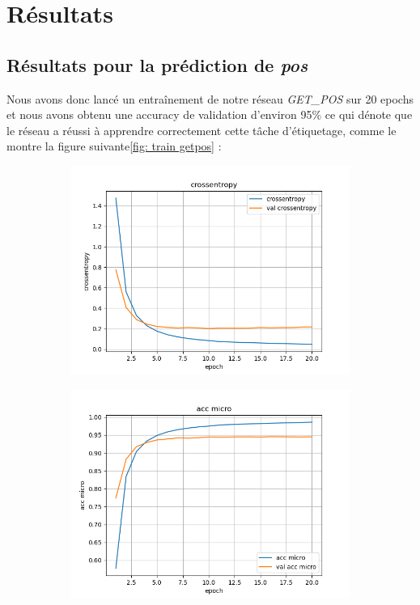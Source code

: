 \documentclass[a4paper]{article}
\begin{document}
\section{Résultats}

\subsection{Résultats pour la prédiction de \textit{pos}}
Nous avons donc lancé un entraînement de notre réseau \textit{GET\_POS} sur 20 epochs et 
nous avons obtenu une accuracy de validation d'environ 95\% ce qui dénote que le réseau a réussi à apprendre 
correctement cette tâche d'étiquetage, comme le montre la figure suivante\ref{fig: train getpos} :

\begin{figure}[H]
    \centering
    \begin{subfigure}{0.32\textwidth}
        \centering
        \includegraphics[width=\linewidth]{../logs/get_pos/crossentropy.png}
    \end{subfigure}
    \begin{subfigure}{0.32\textwidth}
        \centering
        \includegraphics[width=\linewidth]{../logs/get_pos/acc micro.png}

\end{subfigure}
\end{figure}
\end{document}
